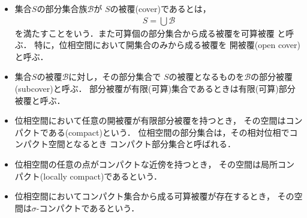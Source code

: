 	\begin{screen}
		\begin{dfn}\mbox{}
			\begin{itemize}
				\item
					集合$S$の部分集合族$\mathscr{B}$が
					$S$の被覆(cover)であるとは，
					\begin{align}
						S = \bigcup \mathscr{B}
					\end{align}
					を満たすことをいう．また可算個の部分集合から成る被覆を可算被覆
					と呼ぶ．
					特に，位相空間において開集合のみから成る被覆を
					開被覆(open cover)と呼ぶ．
				
				\item 集合$S$の被覆$\mathscr{B}$に対し，その部分集合で
					$S$の被覆となるものを$\mathscr{B}$の部分被覆
					(subcover)と呼ぶ．
					部分被覆が有限(可算)集合であるときは有限(可算)部分被覆と呼ぶ．
					
				\item 
					位相空間において任意の開被覆が有限部分被覆を持つとき，
					その空間はコンパクトである(compact)という．
					位相空間の部分集合は，その相対位相でコンパクト空間となるとき
					コンパクト部分集合と呼ばれる．
				
				\item 位相空間の任意の点がコンパクトな近傍を持つとき，
					その空間は局所コンパクト(locally compact)であるという．
					
				\item 位相空間においてコンパクト集合から成る可算被覆が存在するとき，
					その空間は$\sigma$-コンパクトであるという．
			\end{itemize}
		\end{dfn}
	\end{screen}
	
	\begin{screen}
		\begin{thm}[コンパクト部分集合]
		\end{thm}
	\end{screen}
	

